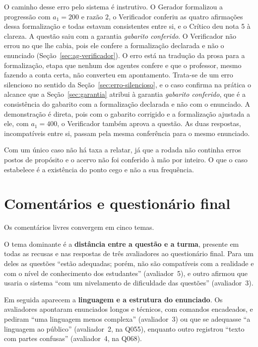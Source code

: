 O caminho desse erro pelo sistema é instrutivo. O Gerador formalizou a progressão com $a_1 = 200$ e
razão $2$, o Verificador conferiu as quatro afirmações dessa formalização e todas estavam
consistentes entre si, e o Crítico deu nota 5 à clareza. A questão saiu com a garantia
\emph{gabarito conferido}. O Verificador não errou no que lhe cabia, pois ele confere a formalização
declarada e não o enunciado (Seção~\ref{sec:ag-verificador}). O erro está na tradução da prosa para a
formalização, etapa que nenhum dos agentes confere e que o professor, mesmo fazendo a conta certa,
não converteu em apontamento. Trata-se de um erro silencioso no sentido da
Seção~\ref{sec:erro-silencioso}, e o caso confirma na prática o alcance que a
Seção~\ref{sec:garantia} atribui à garantia \emph{gabarito conferido}, que é a consistência do
gabarito com a formalização declarada e não com o enunciado. A demonstração é direta, pois com o
gabarito corrigido e a formalização ajustada a ele, com $a_1 = 400$, o Verificador também aprova a
questão. As duas respostas, incompatíveis entre si, passam pela mesma conferência para o mesmo
enunciado.

Com um único caso não há taxa a relatar, já que a rodada não continha erros postos de propósito e o
acervo não foi conferido à mão por inteiro. O que o caso estabelece é a existência do ponto cego e
não a sua frequência.

\section{Comentários e questionário final}
\label{sub:rodada1-comentarios}

Os comentários livres convergem em cinco temas.

O tema dominante é a \textbf{distância entre a questão e a turma}, presente em todas as recusas e
nas respostas de três avaliadores ao questionário final. Para um deles as questões ``estão adequadas;
porém, não são compatíveis com a realidade e com o nível de conhecimento dos estudantes''
(avaliador~5), e outro afirmou que usaria o sistema ``com um nivelamento de dificuldade das
questões'' (avaliador~3).

Em seguida aparecem a \textbf{linguagem e a estrutura do enunciado}. Os avaliadores apontaram
enunciados longos e técnicos, com comandos encadeados, e pediram ``uma linguagem menos complexa''
(avaliador~3) ou que se adequasse ``a linguagem ao público'' (avaliador~2, na Q055), enquanto outro
registrou ``texto com partes confusas'' (avaliador~4, na Q068).

